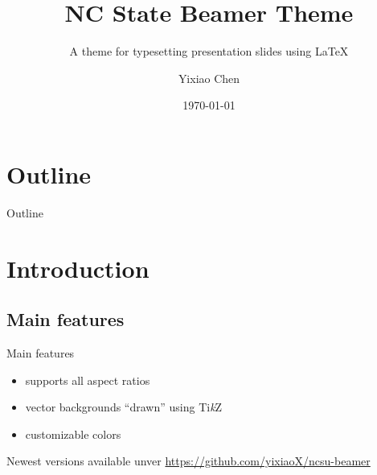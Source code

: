 \documentclass[aspectratio=169]{beamer}
\title{NC State Beamer Theme}
\subtitle{A theme for typesetting presentation slides using \LaTeX{}}
\author{Yixiao Chen}
\institute{Department of Mathematics\\NC State University}
\date{\today}
\begin{document}
\maketitle

\section*{Outline}
\begin{frame}{Outline}
	\tableofcontents
\end{frame}

\section{Introduction}
\subsection{Main features}
\begin{frame}{Main features}
  \begin{itemize}
    \item supports all aspect ratios
    \item vector backgrounds ``drawn'' using Ti\emph{k}Z
    \item customizable colors
  \end{itemize}
  \bigskip
  Newest versions available unver \url{https://github.com/yixiaoX/ncsu-beamer}
\end{frame}

\end{document}
